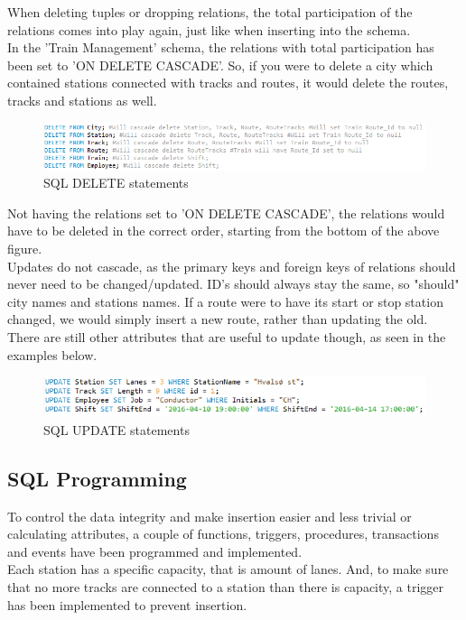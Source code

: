 When deleting tuples or dropping relations, the total participation of the relations comes into play again, just like when inserting into the schema.\\
In the 'Train Management' schema, the relations with total participation has been set to 'ON DELETE CASCADE'. So, if you were to delete a city which contained stations connected with tracks and routes, it would delete the routes, tracks and stations as well.\\

\begin{figure}[ht!]
    \centering
    \includegraphics[width=1\textwidth]{img/DELETE_Statements}
    \caption{SQL DELETE statements}
    \label{fig:ER}
\end{figure}

Not having the relations set to 'ON DELETE CASCADE', the relations would have to be deleted in the correct order, starting from the bottom of the above figure.
\\[12pt]
Updates do not cascade, as the primary keys and foreign keys of relations should never need to be changed/updated. ID's should always stay the same, so "should" city names and stations names. If a route were to have its start or stop station changed, we would simply insert a new route, rather than updating the old.\\
There are still other attributes that are useful to update though, as seen in the examples below.

\begin{figure}[ht!]
    \centering
    \includegraphics[width=1\textwidth]{img/UPDATE_Statements}
    \caption{SQL UPDATE statements}
    \label{fig:ER}
\end{figure}
\newpage

\subsection{SQL Programming}
To control the data integrity and make insertion easier and less trivial or calculating attributes, a couple of functions, triggers, procedures, transactions and events have been programmed and implemented.
\\[12pt]
Each station has a specific capacity, that is amount of lanes. And, to make sure that no more tracks are connected to a station than there is capacity, a trigger has been implemented to prevent insertion.

